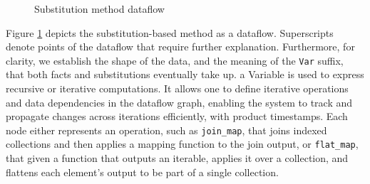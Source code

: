 \documentclass[sigconf,screen,review=false,natbib]{acmart}
\theoremstyle{definition}
\begin{document}
\begin{figure}[htb!]
	\caption{Substitution method dataflow}
	\label{fig:substitution_simple_ddflow}
\end{figure}
Figure \ref{fig:substitution_simple_ddflow} depicts the substitution-based method as a dataflow. Superscripts denote
points of the dataflow that require further explanation. Furthermore, for clarity, we establish the shape of the
data, and the meaning of the \verb|Var| suffix, that both facts and substitutions eventually take up. a Variable is used
to express recursive or iterative computations. It allows one to define iterative operations and data dependencies in
the dataflow graph, enabling the system to track and propagate changes across iterations efficiently, with product
timestamps. Each node either represents an operation, such as \verb|join_map|, that joins indexed collections and
then applies a mapping function to the join output, or \verb|flat_map|, that given a function that outputs an iterable, applies
it over a collection, and flattens each element's output to be part of a single collection.
\end{document}
